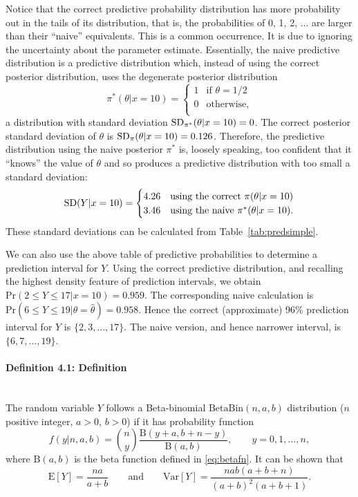 {\begin{table}[ht]
\end{table}
Notice that the correct predictive probability distribution has more
probability out in the tails of its distribution, that is, the
probabilities of 0, 1, 2, $\ldots$ are larger than their ``naive''
equivalents. This is a common occurrence. It is due to ignoring the
uncertainty about the parameter estimate. Essentially, the naive
predictive distribution is a predictive distribution which, instead of
using the correct posterior distribution, uses the degenerate
posterior distribution
\begin{equation*}
\pi^*(\theta|x=10)=\begin{cases} 1 & \text{if } \theta=1/2 \\
                                 0 & \text{otherwise}, \\
              \end{cases}
\end{equation*}
a distribution with standard deviation $\textnormal{SD}_{\pi^*}(\theta|x=10)=0$.
The correct posterior standard deviation of $\theta$ is
$\textnormal{SD}_\pi(\theta|x=10)=0.126$.  Therefore, the predictive distribution
using the naive posterior $\pi^*$ is, loosely speaking, too confident
that it ``knows'' the value of $\theta$ and so produces a predictive
distribution with too small a standard deviation:
\begin{equation*}
\textnormal{SD}(Y|x=10)=
\begin{cases} 4.26  & \text{using the correct }\pi(\theta|x=10) \\
              3.46  & \text{using the naive }\pi^*(\theta|x=10). \\
         \end{cases}
\end{equation*}
These standard deviations can be calculated from
Table~\ref{tab:predsimple}. 



We can also use the above table of predictive probabilities to determine a
prediction interval for $Y$. Using the correct predictive
distribution, and recalling the highest density feature of prediction
intervals, we obtain $\text{Pr}(2\leq Y\leq 17|x=10)=0.959$. The
corresponding naive calculation is $\text{Pr}(6\leq Y\leq
19|\theta=\hat{\theta})=0.958$. Hence the correct (approximate) 96\%
prediction interval for $Y$ is $\{2,3,\ldots,17\}$. The naive version,
and hence narrower interval, is $\{6,7,\ldots,19\}$.}

\paragraph{Definition 4.1: Definition}{~\\
The random variable $Y$ follows a Beta-binomial $\mathrm{BetaBin}(n,a,b)$
distribution ($n$ positive integer, $a>0$, $b>0$) if it has
probability function
$$f(y|n,a,b)=\binom{n}{y}\frac{\mathrm{B}(y+a,b+n-y)}{\mathrm{B}(a,b)}, \quad\quad
y=0,1,\ldots,n,$$ 
where $\mathrm{B}(a,b)$ is the beta function defined in \eqref{eq:betafn}. It can be shown that
$$\text{E}[Y] =\frac{na}{a+b}\quad\quad\text{and}\quad\quad
\text{Var}[Y]=\frac{nab(a+b+n)}{(a+b)^2(a+b+1)}. $$}

